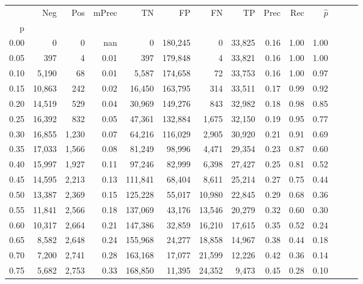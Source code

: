 \begin{tabular}{rrrrrrrrrrrrrr}
\toprule
{} &     Neg &    Pos & mPrec &       TN &       FP &      FN &      TP &  Prec &   Rec & $\hat{p}$ \\
p    &         &        &       &          &          &         &         &       &       &           \\
\midrule
0.00 &       0 &      0 &   nan &        0 &  180,245 &       0 &  33,825 &  0.16 &  1.00 &      1.00 \\
0.05 &     397 &      4 &  0.01 &      397 &  179,848 &       4 &  33,821 &  0.16 &  1.00 &      1.00 \\
0.10 &   5,190 &     68 &  0.01 &    5,587 &  174,658 &      72 &  33,753 &  0.16 &  1.00 &      0.97 \\
0.15 &  10,863 &    242 &  0.02 &   16,450 &  163,795 &     314 &  33,511 &  0.17 &  0.99 &      0.92 \\
0.20 &  14,519 &    529 &  0.04 &   30,969 &  149,276 &     843 &  32,982 &  0.18 &  0.98 &      0.85 \\
0.25 &  16,392 &    832 &  0.05 &   47,361 &  132,884 &   1,675 &  32,150 &  0.19 &  0.95 &      0.77 \\
0.30 &  16,855 &  1,230 &  0.07 &   64,216 &  116,029 &   2,905 &  30,920 &  0.21 &  0.91 &      0.69 \\
0.35 &  17,033 &  1,566 &  0.08 &   81,249 &   98,996 &   4,471 &  29,354 &  0.23 &  0.87 &      0.60 \\
0.40 &  15,997 &  1,927 &  0.11 &   97,246 &   82,999 &   6,398 &  27,427 &  0.25 &  0.81 &      0.52 \\
0.45 &  14,595 &  2,213 &  0.13 &  111,841 &   68,404 &   8,611 &  25,214 &  0.27 &  0.75 &      0.44 \\
0.50 &  13,387 &  2,369 &  0.15 &  125,228 &   55,017 &  10,980 &  22,845 &  0.29 &  0.68 &      0.36 \\
0.55 &  11,841 &  2,566 &  0.18 &  137,069 &   43,176 &  13,546 &  20,279 &  0.32 &  0.60 &      0.30 \\
0.60 &  10,317 &  2,664 &  0.21 &  147,386 &   32,859 &  16,210 &  17,615 &  0.35 &  0.52 &      0.24 \\
0.65 &   8,582 &  2,648 &  0.24 &  155,968 &   24,277 &  18,858 &  14,967 &  0.38 &  0.44 &      0.18 \\
0.70 &   7,200 &  2,741 &  0.28 &  163,168 &   17,077 &  21,599 &  12,226 &  0.42 &  0.36 &      0.14 \\
0.75 &   5,682 &  2,753 &  0.33 &  168,850 &   11,395 &  24,352 &   9,473 &  0.45 &  0.28 &      0.10 \\

\end{tabular}
